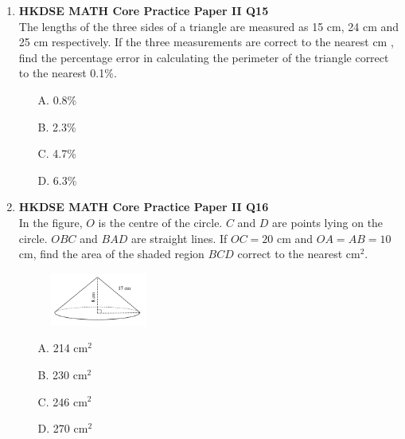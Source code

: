 \documentclass[12pt]{article}
\begin{document}
\begin{enumerate}
	\item \textbf{HKDSE MATH Core Practice Paper II Q15}\\
	The lengths of the three sides of a triangle are measured as 15 cm, 24 cm and 25 cm respectively. If the three measurements are correct to the nearest cm , find the percentage error in calculating the perimeter of the triangle correct to the nearest 0.1\%.
	\begin{enumerate}
		\item[A.] 0.8\%
		\item[B.] 2.3\%
		\item[C.] 4.7\%
		\item[D.] 6.3\%
	\end{enumerate}

	\item \textbf{HKDSE MATH Core Practice Paper II Q16}\\
	In the figure, $O$ is the centre of the circle. $C$ and $D$ are points lying on the circle. $OBC$ and $BAD$ are straight lines. If $OC = 20$ cm and $OA = AB = 10$ cm, find the area of the shaded region $BCD$ correct to the nearest cm$^2$.
	\begin{figure}[h]
		\centering
		\includegraphics[width = 0.3\textwidth]{PPFigure2.16.png}	
	\end{figure}
	\begin{enumerate}
		\item[A.] 214 cm$^2$
		\item[B.] 230 cm$^2$
		\item[C.] 246 cm$^2$
		\item[D.] 270 cm$^2$
	\end{enumerate}


\end{enumerate}
\end{document}
